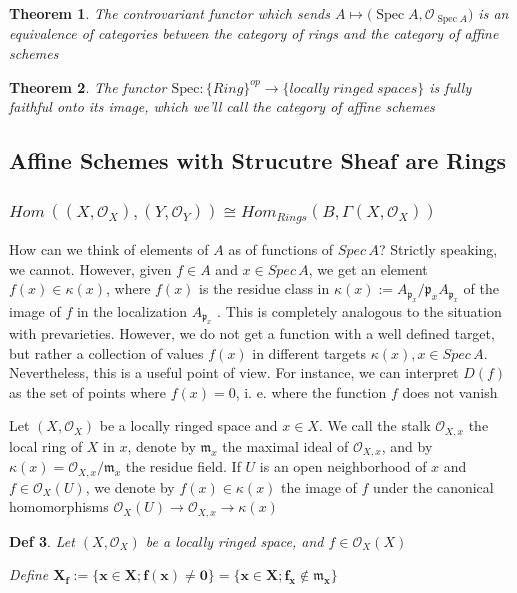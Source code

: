 \documentclass{article}
\newtheorem{theorem}{Theorem}[section]
\newtheorem{definition}[theorem]{Def}
\begin{document}
\begin{theorem}
    The controvariant functor which sends $A\mapsto{\bigl(}\operatorname{Spec}A,{\mathcal{O}}_{\operatorname{Spec}A}{\bigr)}$ is an equivalence of categories between the category of rings and the category of affine schemes
\end{theorem}
\begin{theorem}
    The functor $\mathrm{Spec} : \{Ring\}^{op}\to\{locally\;ringed\;spaces\}$ is fully faithful onto its image, which we’ll call the category of affine schemes
\end{theorem}



\newpage
\subsection{Affine Schemes with Strucutre Sheaf are Rings}
\subsubsection{$
Hom\,((X,{\mathcal{O}}_{X}),(Y,{\mathcal{O}}_{Y}))
\cong
Hom_{Rings}(B,\Gamma(X,{\mathcal{O}}_{X}))
$}

How can we think of elements of $A$ as of functions of $Spec\, A$? Strictly speaking,
we cannot. However, given $f \in A$ and $x \in Spec\, A$, we get an element $f(x) \in \kappa(x)$, where
$f(x)$ is the residue class in $\kappa(x) := A_{\mathfrak p_x} /\mathfrak p_xA_{\mathfrak p_x}$ of the image of $f$ in the localization $A_{\mathfrak p_x}$ .
This is completely analogous to the situation with prevarieties. However, we do not get
a function with a well defined target, but rather a collection of values $f(x)$ in different
targets $\kappa(x), x \in Spec\, A$. Nevertheless, this is a useful point of view. For instance, we
can interpret $D(f)$ as the set of points where $f(x) = 0$, i. e. where the function $f$ does
not vanish

Let $(X,\mathcal O_X)$ be a locally ringed space and $x \in X$. We call the stalk $\mathcal O_{X,x}$ the local ring
of $X$ in $x$, denote by $\mathfrak m_x$ the maximal ideal of $\mathcal O_{X,x}$, and by $\kappa(x) =\mathcal O_{X,x}/\mathfrak m_x$ the residue
field. If $U$ is an open neighborhood of $x$ and $f \in\mathcal O_X(U)$, we denote by $f(x) \in \kappa(x)$ the image of $f$ under the canonical homomorphisms $\mathcal O_X(U) \to \mathcal O_{X,x} \to \kappa(x)$

\begin{definition}
Let $(X,\mathcal O_X)$ be a locally ringed space, and $f \in\mathcal O_X(X)$

Define
$\bm{
X_f := \{ x \in X ; f(x) \ne 0 \}=\{ x \in X ; f_x \notin \mathfrak m_x \}
}$
\end{definition}
\end{document}
